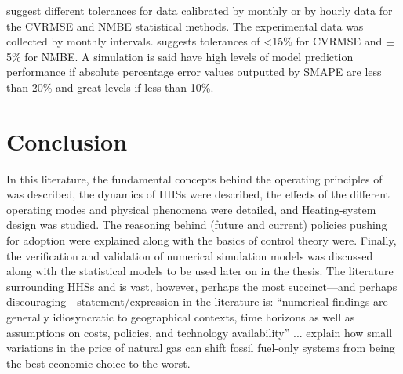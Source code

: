  \cite{ashrae_guideline_project_committee_14_ashrae_2014} suggest different tolerances for data calibrated by monthly or by hourly data for the \ac{CVRMSE} and \ac{NMBE} statistical methods. The experimental data was collected by monthly intervals.  suggests tolerances of <15\% for \ac{CVRMSE} and $\pm$5\% for \ac{NMBE}. A simulation is said have high levels of model prediction performance if absolute percentage error values outputted by \ac{SMAPE} are less than 20\% and great levels if less than 10\%. 


\section{Conclusion}
In this literature, the fundamental concepts behind the operating principles of \HPs was described, the dynamics of \acp{HHS} were described, the effects of the different operating modes and physical phenomena were detailed, and Heating-system design was studied. The reasoning behind (future and current) policies pushing for \HP adoption were explained along with the basics of control theory were. Finally, the verification and validation of numerical simulation models was discussed along with the statistical models to be used later on in the thesis. The literature surrounding \acp{HHS} and \HPs is vast, however, perhaps the most succinct---and perhaps discouraging---statement/expression in the literature is: ``numerical findings are generally idiosyncratic to geographical contexts, time horizons as well as assumptions on costs, policies, and technology availability'' \cite{bloess_power--heat_2018}... \citeauthor{rauschkolb_cost-optimal_2020} \cite{rauschkolb_cost-optimal_2020} explain how small variations in the price of natural gas can shift fossil fuel-only systems from being the best economic choice to the worst. 

